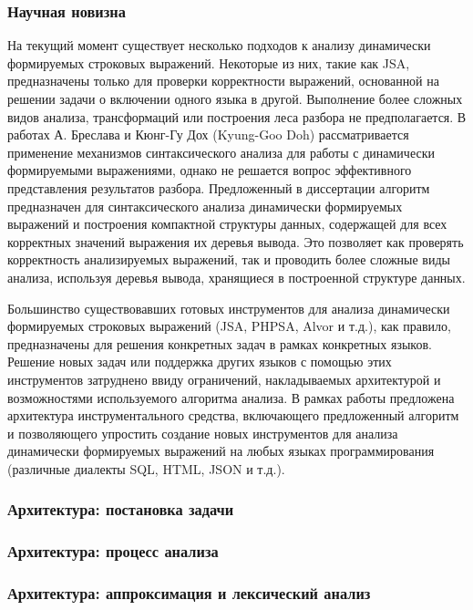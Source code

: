 \documentclass{beamer}
\begin{document}
\begin{frame}
	\transwipe[direction=90]
	\frametitle{Научная новизна}
        На текущий момент существует несколько подходов к анализу динамически формируемых строковых выражений. Некоторые из них, такие как JSA, предназначены только для проверки корректности выражений, основанной на решении задачи о включении одного языка в другой. Выполнение более сложных видов анализа, трансформаций или построения леса разбора не предполагается. В работах А. Бреслава и Кюнг-Гу Дох (Kyung-Goo Doh) рассматривается применение механизмов синтаксического анализа для работы с динамически формируемыми выражениями, однако не решается вопрос эффективного представления результатов разбора. Предложенный в диссертации алгоритм предназначен для синтаксического анализа динамически формируемых выражений и построения компактной структуры данных, содержащей для всех корректных значений выражения их деревья вывода. Это позволяет как проверять корректность анализируемых выражений, так и проводить более сложные виды анализа, используя деревья вывода, хранящиеся в построенной структуре данных.
 
        Большинство существовавших готовых инструментов для анализа динамически формируемых строковых выражений (JSA, PHPSA, Alvor и т.д.), как правило, предназначены для решения конкретных задач в рамках конкретных языков. Решение новых задач или поддержка других языков с помощью этих инструментов затруднено ввиду ограничений, накладываемых архитектурой и возможностями используемого алгоритма анализа. В рамках работы предложена архитектура инструментального средства, включающего предложенный алгоритм и позволяющего упростить создание новых инструментов для анализа динамически формируемых выражений на любых языках программирования (различные диалекты SQL, HTML, JSON и т.д.).

\end{frame}

\begin{frame}
	\transwipe[direction=90]
	\frametitle{Архитектура: постановка задачи}
\end{frame}

\begin{frame}
	\transwipe[direction=90]
	\frametitle{Архитектура: процесс анализа}
\end{frame}

\begin{frame}
	\transwipe[direction=90]
	\frametitle{Архитектура: аппроксимация и лексический анализ}	
\end{frame}
\end{document}
